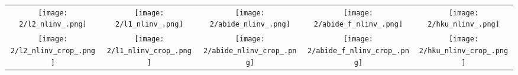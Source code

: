 \begin{tabular}{c @{\hskip 0pt} c @{\hskip 0pt} c @{\hskip 0pt} c @{\hskip 0pt} c}
    \texttt{[image: 2/l2\_nlinv\_.png]}&
    \texttt{[image: 2/l1\_nlinv\_.png]}&
    \texttt{[image: 2/abide\_nlinv\_.png]}&
    \texttt{[image: 2/abide\_f\_nlinv\_.png]}&
    \texttt{[image: 2/hku\_nlinv\_.png]}\\
    \texttt{[image: 2/l2\_nlinv\_crop\_.png]}&
    \texttt{[image: 2/l1\_nlinv\_crop\_.png]}&
    \texttt{[image: 2/abide\_nlinv\_crop\_.png]}&
    \texttt{[image: 2/abide\_f\_nlinv\_crop\_.png]}&
    \texttt{[image: 2/hku\_nlinv\_crop\_.png]}
\end{tabular}

